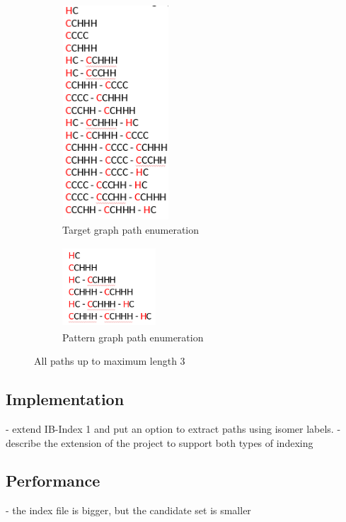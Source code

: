 \documentclass{l4proj}
\theoremstyle{definition}
\begin{document}
\begin{figure}[h]
\centering
\begin{subfigure}{.5\textwidth}
  \centering
  \includegraphics[height=8cm,width=4cm]{graphs_paths/C5H11-isomer-paths.png}
  \caption{Target graph path enumeration}
  \label{C5H11-isomer-paths}
\end{subfigure}%
\begin{subfigure}{.5\textwidth}
  \centering
  \includegraphics[height=3cm,width=3.5cm]{graphs_paths/CH3-isomer-paths.png}
  \caption{Pattern graph path enumeration}
  \label{CH3-isomer-paths}
\end{subfigure}
\caption{All paths up to maximum length 3}
\label{isomer-paths-enumeration}
\end{figure}
       
       \subsection{Implementation}
       
       - extend IB-Index 1 and put an option to extract paths using isomer labels.
       - describe the extension of the project to support both types of indexing
       
        \subsection{Performance}
        - the index file is bigger, but the candidate set is smaller
        
\end{document}
